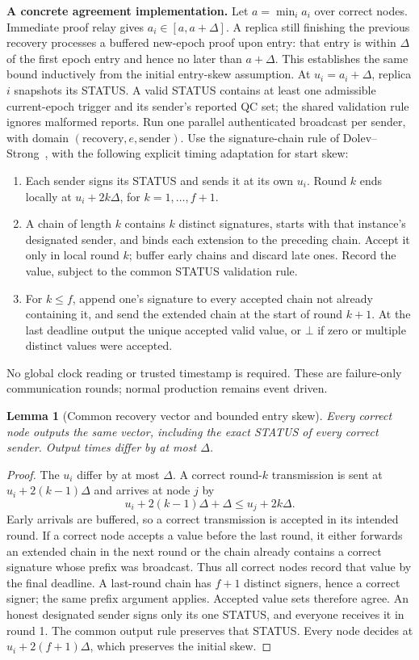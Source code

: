 \documentclass[10pt,a4paper]{article}
\newtheorem{lemma}{Lemma}
\begin{document}
\textbf{A concrete agreement implementation.} Let $a=\min_i a_i$ over correct
nodes. Immediate proof relay gives $a_i\in[a,a+\Delta]$. A replica still
finishing the previous recovery processes a buffered new-epoch proof upon
entry: that entry is within $\Delta$ of the first epoch entry and hence
no later than $a+\Delta$. This establishes the same bound inductively
from the initial entry-skew assumption. At
$u_i=a_i+\Delta$, replica $i$ snapshots its STATUS. A valid STATUS contains
at least one admissible current-epoch trigger and its sender's reported QC
set; the shared validation rule ignores malformed reports. Run one parallel
authenticated broadcast per sender, with domain $(\text{recovery},e,\text{sender})$.
Use the signature-chain rule of Dolev--Strong~\cite{ds}, with the following
explicit timing adaptation for start skew:
\begin{enumerate}[label=\arabic*.,itemsep=3pt]
\item Each sender signs its STATUS and sends it at its own $u_i$. Round $k$
ends locally at $u_i+2k\Delta$, for $k=1,\ldots,f+1$.
\item A chain of length $k$ contains $k$ distinct signatures, starts with
that instance's designated sender, and binds each extension to the preceding
chain. Accept it only in local round $k$; buffer early chains and discard
late ones. Record the value, subject to the common STATUS validation rule.
\item For $k\le f$, append one's signature to every accepted chain not
already containing it, and send the extended chain at the start of round
$k+1$. At the last deadline output the unique accepted valid value, or
$\bot$ if zero or multiple distinct values were accepted.
\end{enumerate}
No global clock reading or trusted timestamp is required. These are
failure-only communication rounds; normal production remains event driven.

\begin{lemma}[Common recovery vector and bounded entry skew]
Every correct node outputs the same vector, including the exact STATUS of
every correct sender. Output times differ by at most $\Delta$.
\end{lemma}
\begin{proof}
The $u_i$ differ by at most $\Delta$. A correct round-$k$ transmission is
sent at $u_i+2(k-1)\Delta$ and arrives at node $j$ by
\[
 u_i+2(k-1)\Delta+\Delta\le u_j+2k\Delta.
\]
Early arrivals are buffered, so a correct transmission is accepted in its
intended round. If a correct node accepts a value before the last round,
it either forwards an extended chain in the next round or the chain already
contains a correct signature whose prefix was broadcast. Thus all correct
nodes record that value by the final deadline. A last-round chain has
$f+1$ distinct signers, hence a correct signer; the same prefix argument
applies. Accepted value sets therefore agree. An honest designated sender
signs only its one STATUS, and everyone receives it in round 1. The common
output rule preserves that STATUS. Every node decides at $u_i+2(f+1)\Delta$,
which preserves the initial skew.
\end{proof}
\end{document}
